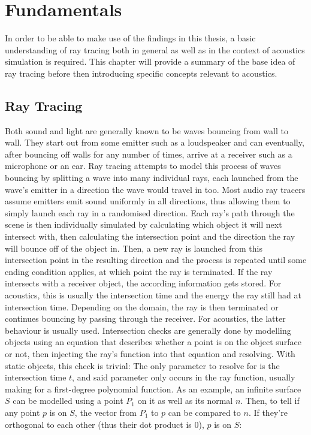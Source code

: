 \chapter{Fundamentals}\label{ch:Fundamentals}

In order to be able to make use of the findings in this thesis,
a basic understanding of ray tracing both in general as well as in the context of acoustics simulation is required.
This chapter will provide a summary of the base idea of ray tracing
before then introducing specific concepts relevant to acoustics.

\section{Ray Tracing}\label{sec:FundamentalRT}

Both sound and light are generally known to be waves bouncing from wall to wall.
They start out from some emitter such as a loudspeaker and can eventually,
after bouncing off walls for any number of times, arrive at a receiver such as a microphone or an ear.
Ray tracing attempts to model this process of waves bouncing by splitting a wave into many individual rays,
each launched from the wave's emitter in a direction the wave would travel in too.
Most audio ray tracers assume emitters emit sound uniformly in all directions,
thus allowing them to simply launch each ray in a randomised direction.
\newline
Each ray's path through the scene is then individually simulated
by calculating which object it will next intersect with,
then calculating the intersection point and the direction the ray will bounce off of the object in.
Then, a new ray is launched from this intersection point in the resulting direction and the process is repeated
until some ending condition applies, at which point the ray is terminated.
If the ray intersects with a receiver object, the according information gets stored.
For acoustics, this is usually the intersection time and the energy the ray still had at intersection time.
Depending on the domain, the ray is then terminated or continues bouncing by passing through the receiver.
For acoustics, the latter behaviour is usually used.
\newline
Intersection checks are generally done by modelling objects using an equation that describes whether a point is on the object surface or not,
then injecting the ray's function into that equation and resolving.
With static objects, this check is trivial:
The only parameter to resolve for is the intersection time \(t\), and said parameter only occurs in the ray function,
usually making for a first-degree polynomial function.
\newline
As an example, an infinite surface \(S\) can be modelled using a point \(P_1\) on it as well as its normal \(n\).
Then, to tell if any point \(p\) is on \(S\), the vector from \(P_1\) to \(p\) can be compared to \(n\).
If they're orthogonal to each other (thus their dot product is 0), \(p\) is on \(S\):

